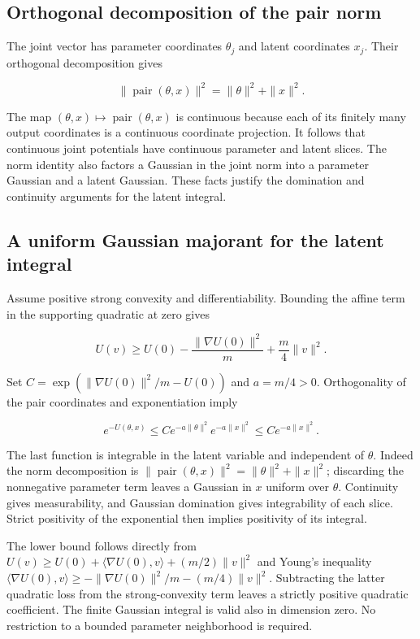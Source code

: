 \documentclass[11pt,a4paper]{article}
\begin{document}
\subsection{\texorpdfstring{Orthogonal decomposition of the pair norm}{Orthogonal decomposition of the pair norm}}


The joint vector has parameter coordinates \(\theta_j\) and latent coordinates \(x_j\). Their orthogonal decomposition gives

\[\|\operatorname{pair}(\theta,x)\|^2=\|\theta\|^2+\|x\|^2.\]

The map \((\theta,x)\mapsto\operatorname{pair}(\theta,x)\) is continuous because each of its finitely many output coordinates is a continuous coordinate projection. It follows that continuous joint potentials have continuous parameter and latent slices. The norm identity also factors a Gaussian in the joint norm into a parameter Gaussian and a latent Gaussian. These facts justify the domination and continuity arguments for the latent integral.



\subsection{\texorpdfstring{A uniform Gaussian majorant for the latent integral}{A uniform Gaussian majorant for the latent integral}}


Assume positive strong convexity and differentiability. Bounding the affine term in the supporting quadratic at zero gives

\[U(v)\ge U(0)-\frac{\|\nabla U(0)\|^2}{m}+\frac m4\|v\|^2.\]

Set \(C=\exp(\|\nabla U(0)\|^2/m-U(0))\) and \(a=m/4>0\). Orthogonality of the pair coordinates and exponentiation imply

\[e^{-U(\theta,x)}\le Ce^{-a\|\theta\|^2}e^{-a\|x\|^2}\le Ce^{-a\|x\|^2}.\]

The last function is integrable in the latent variable and independent of \(\theta\). Indeed the norm decomposition is \(\|\operatorname{pair}(\theta,x)\|^2=\|\theta\|^2+\|x\|^2\); discarding the nonnegative parameter term leaves a Gaussian in \(x\) uniform over \(\theta\). Continuity gives measurability, and Gaussian domination gives integrability of each slice. Strict positivity of the exponential then implies positivity of its integral.



The lower bound follows directly from \(U(v)\ge U(0)+\langle\nabla U(0),v\rangle+(m/2)\|v\|^2\) and Young’s inequality \(\langle\nabla U(0),v\rangle\ge-\|\nabla U(0)\|^2/m-(m/4)\|v\|^2\). Subtracting the latter quadratic loss from the strong-convexity term leaves a strictly positive quadratic coefficient. The finite Gaussian integral is valid also in dimension zero. No restriction to a bounded parameter neighborhood is required.
\end{document}
